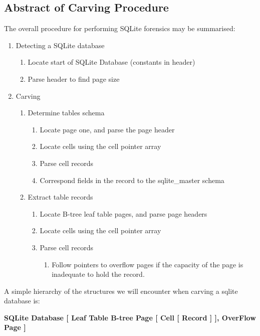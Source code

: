 \documentclass{article}
\begin{document}
\subsection{Abstract of Carving Procedure}
\noindent The overall procedure for performing SQLite forensics may be summarised:
\begin{enumerate}
  \item Detecting a SQLite database 
    \begin{enumerate}
      \item Locate start of SQLite Database (constants in header)
      \item Parse header to find page size
    \end{enumerate}
  \item Carving
    \begin{enumerate}
      \item Determine tables schema
        \begin{enumerate}
          \item Locate page one, and parse the page header
          \item Locate cells using the cell pointer array
          \item Parse cell records
          \item Correspond fields in the record to the sqlite_master schema
        \end{enumerate}
      \item Extract table records
        \begin{enumerate}
          \item Locate B-tree leaf table pages, and parse page headers
          \item Locate cells using the cell pointer array
          \item Parse cell records
            \begin{enumerate}
              \item Follow pointers to overflow pages if the capacity of the page is inadequate to hold the record.
            \end{enumerate}
        \end{enumerate}
    \end{enumerate}
\end{enumerate}

\noindent A simple hierarchy of the structures we will encounter when carving a sqlite database is:

\textbf{SQLite Database [ Leaf Table B-tree Page [ Cell [ Record ] ], OverFlow Page ]}
\end{document}
